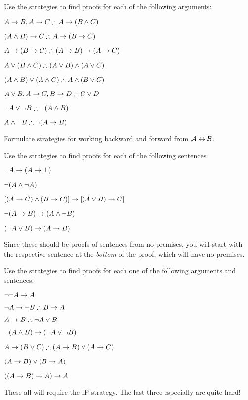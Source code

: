 \practiceproblems

\problempart
Use the strategies to find proofs for each of the following arguments:
\begin{earg}
\item $A \eif B, A \eif C \therefore A \eif (B \eand C)$
\item $(A \eand B) \eif C \therefore A \eif (B \eif C)$
\item $A \eif (B \eif C) \therefore (A \eif B) \eif (A \eif C)$
\item $A \eor (B \eand C) \therefore (A \eor B) \eand (A \eor C)$
\item $(A \eand B) \eor (A \eand C) \therefore A \eand (B \eor C)$
\item $A \eor B, A \eif C, B \eif D \therefore C \eor D$
\item $\enot A \lor \enot B \therefore \enot(A \eand B)$
\item $A \eand \enot B \therefore \enot(A \eif B)$
\end{earg}

\problempart
Formulate strategies for working backward and forward from $\mathcal{A} \leftrightarrow \mathcal{B}$.

\problempart
Use the strategies to find proofs for each of the following sentences:
\begin{earg}
\item $\neg A \rightarrow (A \rightarrow \bot)$
\item $\neg(A \wedge \neg A)$
\item $[(A \rightarrow C) \wedge (B \rightarrow C)] \rightarrow [(A \lor B) \rightarrow C]$
\item $\neg(A \rightarrow B) \rightarrow (A \wedge \neg B)$
\item $(\neg A \vee B) \rightarrow (A \rightarrow B)$
\end{earg}
Since these should be proofs of sentences from no premises, you will start with the respective sentence at the \emph{bottom} of the proof, which will have no premises.

\problempart
Use the strategies to find proofs for each one of the following arguments and sentences:
\begin{earg}
\item $\neg\neg A \rightarrow A$
\item $\enot A \eif \enot B \therefore B \eif A$
\item $A \eif B \therefore \enot A \eor B$
\item $\neg(A \wedge B) \rightarrow (\neg A \vee \neg B)$
\item $A \eif (B \eor C) \therefore (A \eif B) \eor (A \eif C)$
\item $(A \rightarrow B) \lor (B \rightarrow A)$
\item $((A \rightarrow B) \rightarrow A) \rightarrow A$
\end{earg}
These all will require the IP strategy. The last three especially are quite hard!

